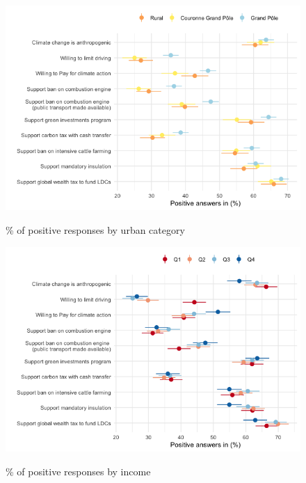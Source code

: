 	\begin{frame}{}%
	\begin{figure}[h!]
	\caption{\% of positive responses by urban category}
	\includegraphics[width=.7\paperwidth]{../figures/FR/positive_all_by_urban_FR.png} \\
	\end{figure}
	\end{frame}
	
	\begin{frame}{}%
	\begin{figure}[h!]
	\caption{\% of positive responses by income}
	\includegraphics[width=.7\paperwidth]{../figures/FR/positive_all_by_income_FR.png} \\
	\end{figure}
	\end{frame}
	
